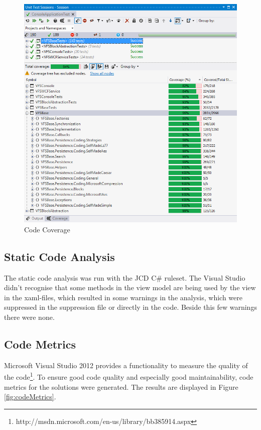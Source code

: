 \documentclass[JCDReport.tex]{subfiles}
\begin{document}
\begin{figure}[h!]
	\centering
	\includegraphics[scale=0.75]{Images/code_coverage.png} 
	\caption{Code Coverage}
	\label{fig:codeCoverage}
\end{figure}	

\subsection{Static Code Analysis}

The static code analysis was run with the JCD C\# ruleset. 
The Visual Studio didn't recognise that some methods in the view model are being used by the view in the xaml-files, which resulted in some warnings in the analysis, which were suppressed in the suppression file or directly in the code. Beside this few warnings there were none.

\subsection{Code Metrics}

Microsoft Visual Studio 2012 provides a functionality to measure the quality of the code\footnote{http://msdn.microsoft.com/en-us/library/bb385914.aspx}. To ensure good code quality and especially good maintainability, code metrics for the solutions were generated. The results are displayed in Figure \ref{fig:codeMetrics}.
\end{document}
